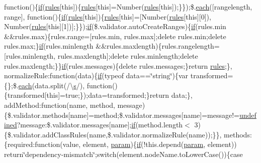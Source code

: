 \begin{DoxyCompactItemize}
function()\{\hyperlink{_scripts_2respond_8min_8js_a93851d60dd037a83509a1757b9ee7b66}{if}(\hyperlink{_scripts_2respond_8js_ada87c2e257bc5ff6e77cdbc23ed986a3}{rules}\mbox{[}this\mbox{]})\{\hyperlink{_scripts_2respond_8js_ada87c2e257bc5ff6e77cdbc23ed986a3}{rules}\mbox{[}this\mbox{]}=Number(\hyperlink{_scripts_2respond_8js_ada87c2e257bc5ff6e77cdbc23ed986a3}{rules}\mbox{[}this\mbox{]});\}\});\$.\hyperlink{_scripts_2jquery-1_810_82_8min_8js_af24c9ea1e34372f8c8b312b35586008d}{each}(\mbox{[}\textquotesingle{}rangelength\textquotesingle{}, \textquotesingle{}range\textquotesingle{}\mbox{]}, function()\{\hyperlink{_scripts_2respond_8min_8js_a93851d60dd037a83509a1757b9ee7b66}{if}(\hyperlink{_scripts_2respond_8js_ada87c2e257bc5ff6e77cdbc23ed986a3}{rules}\mbox{[}this\mbox{]})\{\hyperlink{_scripts_2respond_8js_ada87c2e257bc5ff6e77cdbc23ed986a3}{rules}\mbox{[}this\mbox{]}=\mbox{[}Number(\hyperlink{_scripts_2respond_8js_ada87c2e257bc5ff6e77cdbc23ed986a3}{rules}\mbox{[}this\mbox{]}\mbox{[}0\mbox{]}), Number(\hyperlink{_scripts_2respond_8js_ada87c2e257bc5ff6e77cdbc23ed986a3}{rules}\mbox{[}this\mbox{]}\mbox{[}1\mbox{]})\mbox{]};\}\});\hyperlink{_scripts_2respond_8min_8js_a93851d60dd037a83509a1757b9ee7b66}{if}(\$.validator.\+auto\+Create\+Ranges)\{\hyperlink{_scripts_2respond_8min_8js_a93851d60dd037a83509a1757b9ee7b66}{if}(rules.\+min \&\&rules.\+max)\{rules.\+range=\mbox{[}rules.\+min, rules.\+max\mbox{]};delete rules.\+min;delete rules.\+max;\}\hyperlink{_scripts_2respond_8min_8js_a93851d60dd037a83509a1757b9ee7b66}{if}(rules.\+minlength \&\&rules.\+maxlength)\{rules.\+rangelength=\mbox{[}rules.\+minlength, rules.\+maxlength\mbox{]};delete rules.\+minlength;delete rules.\+maxlength;\}\}\hyperlink{_scripts_2respond_8min_8js_a93851d60dd037a83509a1757b9ee7b66}{if}(rules.\+messages)\{delete rules.\+messages;\}return \hyperlink{_scripts_2respond_8js_ada87c2e257bc5ff6e77cdbc23ed986a3}{rules};\}, normalize\+Rule\+:function(data)\{\hyperlink{_scripts_2respond_8min_8js_a93851d60dd037a83509a1757b9ee7b66}{if}(typeof data==\char`\"{}string\char`\"{})\{var transformed=\{\};\$.\hyperlink{_scripts_2jquery-1_810_82_8min_8js_af24c9ea1e34372f8c8b312b35586008d}{each}(data.\+split(/\textbackslash{}\hyperlink{_scripts_2respond_8min_8js_ad9a7d92cb87932d25187fdec3ba1b621}{s}/), function()\{transformed\mbox{[}this\mbox{]}=true;\});data=transformed;\}return data;\}, add\+Method\+:function(name, method, message)\{\$.validator.\+methods\mbox{[}name\mbox{]}=method;\$.validator.\+messages\mbox{[}name\mbox{]}=message!=\hyperlink{_scripts_2jquery-1_810_82_8js_a08113a236cc18d2a9d5ce27e638012be}{undefined}?message\+:\$.\+validator.\+messages\mbox{[}name\mbox{]};\hyperlink{_scripts_2respond_8min_8js_a93851d60dd037a83509a1757b9ee7b66}{if}(method.\+length$<$ 3)\{\$.validator.\+add\+Class\+Rules(name,\$.validator.\+normalize\+Rule(name));\}\}, methods\+:\{required\+:function(value, element, \hyperlink{_scripts_2jquery-1_810_82_8min_8js_ae8915303d11557d1b001bc56b6195251}{param})\{\hyperlink{_scripts_2respond_8min_8js_a93851d60dd037a83509a1757b9ee7b66}{if}(!this.\+depend(\hyperlink{_scripts_2jquery-1_810_82_8min_8js_ae8915303d11557d1b001bc56b6195251}{param}, element)) return\char`\"{}dependency-\/mismatch\char`\"{};switch(element.\+node\+Name.\+to\+Lower\+Case())\{case 
\end{DoxyCompactItemize}
